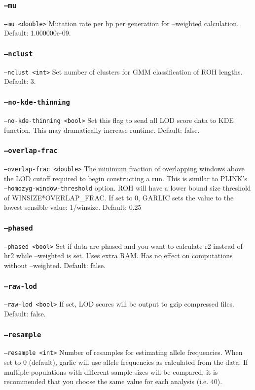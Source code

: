 \documentclass[12pt]{article}%
\begin{document}
\subsubsection{{\tt --mu}}
{\tt --mu <double>} Mutation rate per bp per generation for --weighted calculation. Default: 1.000000e-09.

\subsubsection{{\tt --nclust}}
{\tt --nclust <int>} Set number of clusters for GMM classification of ROH lengths. Default: 3.

\subsubsection{{\tt --no-kde-thinning}}
{\tt --no-kde-thinning <bool>} Set this flag to send all LOD score data to KDE function. This may dramatically increase runtime. Default: false.

\subsubsection{{\tt --overlap-frac}}
{\tt --overlap-frac <double>} The minimum fraction of overlapping windows above the LOD cutoff required to begin constructing a run. This is similar to PLINK's {\tt --homozyg-window-threshold} option. ROH will have a lower bound size threshold of WINSIZE*OVERLAP\_FRAC. If set to 0, GARLIC sets the value to the lowest sensible value: 1/winsize. Default: 0.25

\subsubsection{{\tt --phased}}
{\tt --phased <bool>} Set if data are phased and you want to calculate r2 instead of hr2 while --weighted is set.
Uses extra RAM. Has no effect on computations without --weighted. Default: false.

\subsubsection{{\tt --raw-lod}}
{\tt --raw-lod <bool>} If set, LOD scores will be output to gzip compressed files. Default: false.

\subsubsection{{\tt --resample}}
{\tt --resample <int>} Number of resamples for estimating allele frequencies. When set to $0$ (default), garlic will use allele frequencies as calculated from the data. If multiple populations with different sample sizes will be compared, it is recommended that you choose the same value for each analysis (i.e. $40$).
\end{document}
